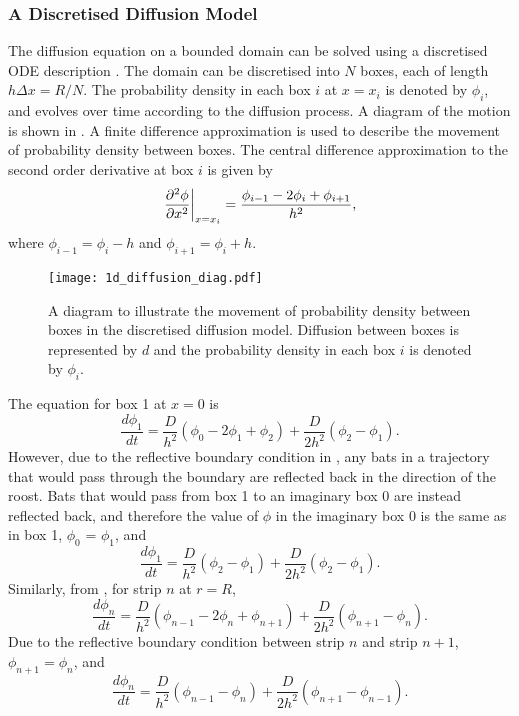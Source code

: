  \subsubsection{A Discretised Diffusion Model} \label{1ddiscrete}

 The diffusion equation on a bounded domain can be solved using a discretised ODE description \cite{woolley2011stochastic}. The domain can be discretised into $N$ boxes, each of length
 $h\Delta x=R/N$. The probability density in each box $i$ at $x=x_i$ is denoted by $\phi_i$, and evolves over time according to the diffusion process. A diagram of the motion is shown in . A finite difference approximation is used to describe the movement of probability density between boxes. The central difference approximation to the second order derivative at box $i$ is given by
 \begin{equation}
  \left.\frac{\partial^2 \phi}{\partial x^2}\right|_{x=x_i}= \frac{\phi_{i-1}-2\phi_i+\phi_{i+1}}{h^2}, \label{eqn:diffusion_discrete1di}
 \end{equation}
 where $\phi_{i-1} = \phi_i - h$ and $\phi_{i+1} = \phi_i + h$.

 \begin{figure} [t]
     \centering
         \texttt{[image: 1d\_diffusion\_diag.pdf]}
         \caption{A diagram to illustrate the movement of probability density between boxes in the discretised diffusion model. Diffusion between boxes is represented by $d$ and the probability density in each box $i$ is denoted by $\phi_i$.}
     \label{fig:diffusion_diagram1d}
 \end{figure}

 The equation for box 1 at $x = 0$ is
 \begin{equation}
 \frac{d\phi_1}{dt} = \frac{D}{h^2}(\phi_{0}-2\phi_1 +\phi_{2}) + \frac{D}{2h^2} (\phi_{2}-\phi_{1}).
 \end{equation}
 However, due to the reflective boundary condition in , any bats in a trajectory that would pass through the boundary are reflected back in the direction of the roost. Bats that would pass from box 1 to an imaginary box 0 are instead reflected back, and therefore the value of $\phi$ in the imaginary box 0 is the same as in box 1, $\phi_0$ = $\phi_1$, and
 \begin{equation}
 \frac{d\phi_1}{dt} = \frac{D}{h^2}(\phi_{2}- \phi_1) + \frac{D}{2h^2} (\phi_{2}-\phi_{1}) .
         \label{eqn:box_1}
 \end{equation}
%
 Similarly, from , for strip $n$ at $r=R$,
 \begin{equation}
 \frac{d\phi_n}{dt} = \frac{D}{h^2}(\phi_{n-1}-2\phi_n +\phi_{n+1}) + \frac{D}{2h^2} (\phi_{n+1}-\phi_{n}) .
 \end{equation}
 Due to the reflective boundary condition between strip $n$ and strip $n+1$, $\phi_{n+1} = \phi_n$, and
 \begin{equation}
 \frac{d\phi_n}{dt} = \frac{D}{h^2}(\phi_{n-1}-\phi_n) + \frac{D}{2h^2} (\phi_{n+1}-\phi_{n-1}) .
         \label{eqn:strip_n1d}
 \end{equation}

